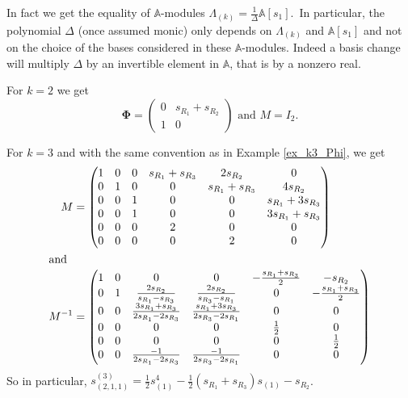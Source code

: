 \documentclass[ALCO,ThmDefs,Unicode,epreuves]{cedram}
\begin{document}
\begin{rema}
In fact we get the equality of $\mathbb{A}$-modules $\Lambda_{(k)}=\frac
{1}{\Delta}\mathbb{A}[s_{1}]$.\ In particular, the polynomial $\Delta$ (once
assumed monic) only depends on $\Lambda_{(k)}$ and $\mathbb{A}[s_{1}]$ and not
on the choice of the bases considered in these $\mathbb{A}$-modules. Indeed a
basis change will multiply $\Delta$ by an invertible element in $\mathbb{A}$,
that is by a nonzero real.
\end{rema}

\begin{exam}
For $k=2$ we get
\[
\boldsymbol{\Phi}=\left(
\begin{matrix}
0 & s_{R_{1}}+s_{R_{2}}\\
1 & 0
\end{matrix}
\right) \text{ and }M=I_{2}.
\]

\end{exam}

\begin{exam}
\label{Examk=3}For $k=3$ and with the same convention as in Example
\ref{ex_k3_Phi}, we get%
\begin{align*}
M&=\left(
\begin{matrix}
1 & 0 & 0 & s_{R_{1}}+s_{R_{3}} & 2s_{R_{2}} & 0\\
0 & 1 & 0 & 0 & s_{R_{1}}+s_{R_{3}} & 4s_{R_{2}}\\
0 & 0 & 1 & 0 & 0 & s_{R_{1}}+3s_{R_{3}}\\
0 & 0 & 1 & 0 & 0 & 3s_{R_{1}}+s_{R_{3}}\\
0 & 0 & 0 & 2 & 0 & 0\\
0 & 0 & 0 & 0 & 2 & 0
\end{matrix}
\right) \\
\intertext{and}
M^{-1}&=\left(
\begin{matrix}
1 & 0 & 0 & 0 & -\frac{s_{R_{1}}+s_{R_{3}}}{2} & -s_{R_{2}}\\
0 & 1 & \frac{2s_{R_{2}}}{s_{R_{1}}-s_{R_{3}}} & \frac{2s_{R_{2}}}{s_{R_{3}%
}-s_{R_{1}}} & 0 & -\frac{s_{R_{1}}+s_{R_{3}}}{2}\\
0 & 0 & \frac{3s_{R_{1}}+s_{R_{3}}}{2s_{R_{1}}-2s_{R_{3}}} & \frac{s_{R_{1}%
}+3s_{R_{3}}}{2s_{R_{3}}-2s_{R_{1}}} & 0 & 0\\
0 & 0 & 0 & 0 & \frac{1}{2} & 0\\
0 & 0 & 0 & 0 & 0 & \frac{1}{2}\\
0 & 0 & \frac{-1}{2s_{R_{1}}-2s_{R_{3}}} & \frac{-1}{2s_{R_{3}}-2s_{R_{1}}} &
0 & 0
\end{matrix}
\right) %
\end{align*}
So in particular, $s_{(2,1,1)}^{(3)}=\frac{1}{2}s_{(1)}^{4}-\frac{1}%
{2}(s_{R_{1}}+s_{R_{3}})s_{(1)}-s_{R_{2}}$.
\end{exam}
\end{document}

